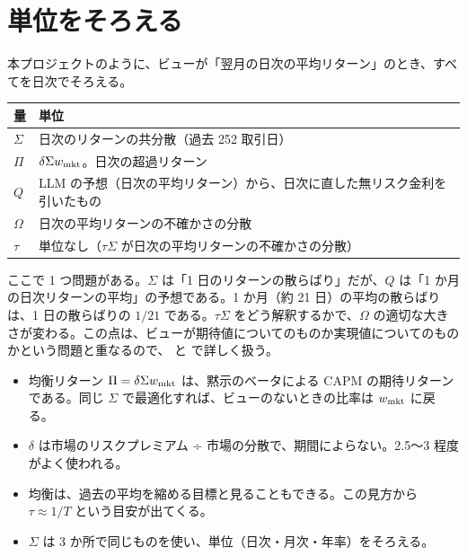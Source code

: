 \section{単位をそろえる}

本プロジェクトのように、ビューが「翌月の日次の平均リターン」のとき、すべてを日次でそろえる。

\begin{center}
\small
\begin{tabular}{p{3.2cm}p{10.4cm}}
\toprule
量 & 単位 \\
\midrule
$\Sigma$ & 日次のリターンの共分散（過去 252 取引日） \\
$\Pi$ & $\delta\Sigma w_{\mathrm{mkt}}$。日次の超過リターン \\
$Q$ & LLM の予想（日次の平均リターン）から、日次に直した無リスク金利を引いたもの \\
$\Omega$ & 日次の平均リターンの不確かさの分散 \\
$\tau$ & 単位なし（$\tau\Sigma$ が日次の平均リターンの不確かさの分散） \\
\bottomrule
\end{tabular}
\end{center}

ここで 1 つ問題がある。$\Sigma$ は「1 日のリターンの散らばり」だが、$Q$ は「1 か月の日次リターンの平均」の予想である。1 か月（約 21 日）の平均の散らばりは、1 日の散らばりの $1/21$ である。$\tau\Sigma$ をどう解釈するかで、$\Omega$ の適切な大きさが変わる。この点は、ビューが期待値についてのものか実現値についてのものかという問題と重なるので、 と  で詳しく扱う。

\begin{keybox}[この章のまとめ]
\begin{itemize}
\item 均衡リターン $\Pi=\delta\Sigma w_{\mathrm{mkt}}$ は、黙示のベータによる CAPM の期待リターンである。同じ $\Sigma$ で最適化すれば、ビューのないときの比率は $w_{\mathrm{mkt}}$ に戻る。
\item $\delta$ は市場のリスクプレミアム ÷ 市場の分散で、期間によらない。2.5〜3 程度がよく使われる。
\item 均衡は、過去の平均を縮める目標と見ることもできる。この見方から $\tau\approx1/T$ という目安が出てくる。
\item $\Sigma$ は 3 か所で同じものを使い、単位（日次・月次・年率）をそろえる。
\end{itemize}
\end{keybox}
